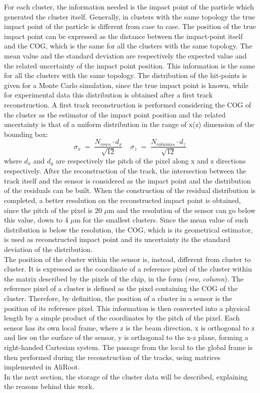 For each cluster, the information needed is the impact point of the particle which generated the cluster itself. Generally, in clusters with the same topology the true impact point of the particle is different from case to case. The position of the true impact point can be expressed as the distance between the impact-point itself and the COG, which is the same for all the clusters with the same topology. The mean value and the standard deviation are respectively the expected value and the related uncertainty of the impact point position. This information is the same for all the clusters with the same topology. The distribution of the hit-points is given for a Monte Carlo simulation, since the true impact point is known, while for experimental data this distribution is obtained after a first track reconstruction. A first track reconstruction is performed considering the COG of the cluster as the estimator of the impact point position and the related uncertainty is that of a uniform distribution in the range of x(z) dimension of the bounding box:
\begin{equation} \label{eq:err}
 \sigma_x \; = \; \frac{N_{rows} \cdot d_x}{\sqrt{12}} \ \ \ \ \  \sigma_z \; = \; \frac{N_{columns} \cdot d_z}{\sqrt{12}}
\end{equation}
where $d_x$ and $d_y$ are respectively the pitch of the pixel along x and z directions respectively. After the reconstruction of the track, the intersection between the track itself and the sensor is considered as the impact point and the distribution of the residuals can be built. When the construction of the residual distribution is completed, a better resolution on the reconstructed impact point is obtained, since the pitch of the pixel is 20 $\mu$m and the resolution of the sensor can go below this value, down to 4 $\mu$m for the smallest clusters\cite{uptdr}. Since the mean value of such distribution is below the resolution, the COG, which is its geometrical estimator, is used as reconstructed impact point and its uncertainty its the standard deviation of the distribution.\\
The position of the cluster within the sensor is, instead, different from cluster to cluster. It is expressed as the coordinate of a reference pixel of the cluster within the matrix described by the pixels of the chip, in the form (\textit{row}, \textit{column}). The reference pixel of a cluster is defined as the pixel containing the COG of the cluster. Therefore, by definition, the position of a cluster in a sensor is the position of its reference pixel. This information is then converted into a physical length by a simple product of the coordinates by the pitch of the pixel. Each sensor has its own local frame, where z is the beam direction, x is orthogonal to z and lies on the surface of the sensor, y is orthogonal to the x-z plane, forming a right-handed Cartesian system. The passage from the local to the global frame is then performed during the reconstruction of the tracks, using matrices implemented in AliRoot.\\
In the next section, the storage of the cluster data will be described, explaining the reasons behind this work.
